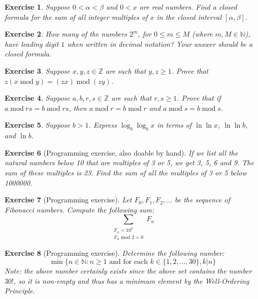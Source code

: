 \documentclass[11pt]{amsart}
\theoremstyle{theorem}
\newtheorem{exercise}{Exercise}
\newcommand\N{\mathbb{N}}
\newcommand\Z{\mathbb{Z}}
\newcommand\Mod{\operatorname{mod}}
\begin{document}
\begin{exercise}
Suppose $0<\alpha<\beta$ and $0<x$ are real numbers. Find a closed formula for the sum of all integer multiples of $x$ in the closed interval $[\alpha,\beta]$.
\end{exercise}

\begin{exercise}
How many of the numbers $2^m$, for $0\leq m\leq M$ (where $m,M\in\N$), have leading digit $1$ when written in decimal notation? Your answer should be a closed formula.
\end{exercise}

\begin{exercise}
Suppose $x,y,z\in\Z$ are such that $y,z\geq 1$. Prove that $z(x\Mod y)=(zx)\Mod (zy)$.
\end{exercise}

\begin{exercise}
Suppose $a,b,r,s\in\Z$ are such that $r,s\geq 1$. Prove that if $a\Mod rs = b\Mod rs$, then $a\Mod r=b\Mod r$ and $a\Mod s=b\Mod s$.
\end{exercise}

\begin{exercise}
Suppose $b>1$. Express $\log_b\log_bx$ in terms of $\ln\ln x$, $\ln\ln b$, and $\ln b$.
\end{exercise}

\begin{exercise}[Programming exercise, also doable by hand]
If we list all the natural numbers below 10 that are multiples of 3 or 5, we get 3, 5, 6 and 9. The sum of these multiples is 23.
Find the sum of all the multiples of 3 or 5 below 1000000.
\end{exercise}

\begin{exercise}[Programming exercise]
Let $F_0,F_1,F_2,\ldots$ be the sequence of Fibonacci numbers. Compute the following sum:
\[
\sum_{\substack{F_n<10^7 \\ F_n\Mod2=0}}F_n
\]
\end{exercise}

\begin{exercise}[Programming exercise]
Determine the following number:
\[
\min\big\{n\in\N:n\geq 1 \text{ and for each }k\in\{1,2,\ldots,30\}, k|n\big\}
\]
Note: the above number certainly exists since the above set contains the number $30!$, so it is non-empty and thus has a minimum element by the Well-Ordering Principle.
\end{exercise}
\end{document}
